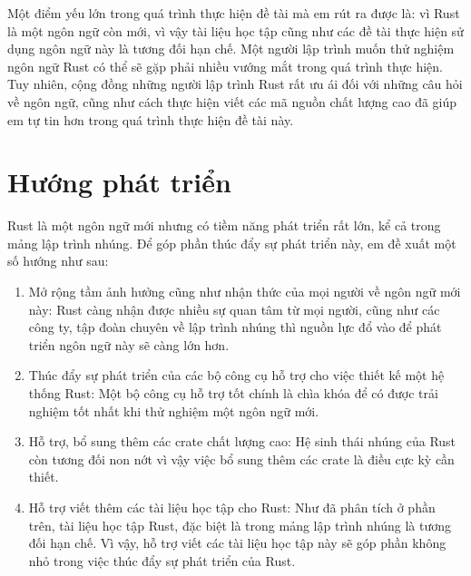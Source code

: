 Một điểm yếu lớn trong quá trình thực hiện đề tài mà em rút ra được là: vì Rust là một ngôn ngữ còn mới, vì vậy tài liệu học tập cũng như các đề tài thực hiện sử dụng ngôn ngữ này là tương đối hạn chế.
Một người lập trình muốn thử nghiệm ngôn ngữ Rust có thể sẽ gặp phải nhiều vướng mắt trong quá trình thực hiện.
Tuy nhiên, cộng đồng những người lập trình Rust rất ưu ái đối với những câu hỏi về ngôn ngữ, cũng như cách thực hiện viết các mã nguồn chất lượng cao đã giúp em tự tin hơn trong quá trình thực hiện đề tài này.

\section{Hướng phát triển}
Rust là một ngôn ngữ mới nhưng có tiềm năng phát triển rất lớn, kể cả trong mảng lập trình nhúng.
Để góp phần thúc đẩy sự phát triển này, em đề xuất một số hướng như sau:
\begin{enumerate}
    \item Mở rộng tầm ảnh hưởng cũng như nhận thức của mọi người về ngôn ngữ mới này:
        Rust càng nhận được nhiều sự quan tâm từ mọi người, cũng như các công ty, tập đoàn chuyên về lập trình nhúng thì nguồn lực đổ vào để phát triển ngôn ngữ này sẽ càng lớn hơn.
    \item Thúc đẩy sự phát triển của các bộ công cụ hỗ trợ cho việc thiết kế một hệ thống Rust:
        Một bộ công cụ hỗ trợ tốt chính là chìa khóa để có được trải nghiệm tốt nhất khi thử nghiệm một ngôn ngữ mới.
    \item Hỗ trợ, bổ sung thêm các crate chất lượng cao:
        Hệ sinh thái nhúng của Rust còn tương đối non nớt vì vậy việc bổ sung thêm các crate là điều cực kỳ cần thiết.
    \item Hỗ trợ viết thêm các tài liệu học tập cho Rust:
        Như đã phân tích ở phần trên, tài liệu học tập Rust, đặc biệt là trong mảng lập trình nhúng là tương đối hạn chế.
        Vì vậy, hỗ trợ viết các tài liệu học tập này sẽ góp phần không nhỏ trong việc thúc đẩy sự phát triển của Rust.
\end{enumerate}
